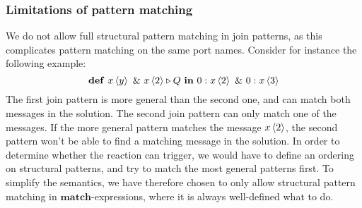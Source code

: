 \subsubsection{Limitations of pattern matching}
We do not allow full structural pattern matching in join patterns, as this
complicates pattern matching on the same port names. Consider for instance the
following example:
\begin{equation*}
 \mathbf{def}~ \atm x<y>~\&~ \atm x<2> \triangleright Q~
 \mathbf{in}~\atm 0:x<2>~\&~\atm 0:x<3>
\end{equation*}
The first join pattern is more general than the second one, and can match both
messages in the solution. The second join pattern can only match one of the
messages. If the more general pattern matches the message $\atm x<2>$, the
second pattern won't be able to find a matching message in the solution. In
order to determine whether the reaction can trigger, we would have to define an
ordering on structural patterns, and try to match the most general patterns
first. To simplify the semantics, we have therefore chosen to only allow
structural pattern matching in $\mathbf{match}$-expressions, where it is always
well-defined what to do.



